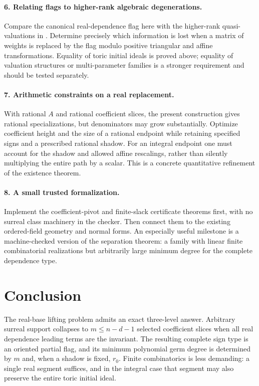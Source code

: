 \documentclass[11pt,a4paper]{article}
\numberwithin{equation}{section}
\theoremstyle{plain}
\begin{document}
\paragraph{6. Relating flags to higher-rank algebraic degenerations.}
Compare the canonical real-dependence flag here with the higher-rank
quasi-valuations in \cite{fs:CCFL}. Determine precisely which information is
lost when a matrix of weights is replaced by the flag modulo positive
triangular and affine transformations. Equality of toric initial ideals
is proved above; equality of valuation structures or multi-parameter
families is a stronger requirement and should be tested separately.

\paragraph{7. Arithmetic constraints on a real replacement.}
With rational $A$ and rational coefficient slices, the present construction
gives rational specializations, but denominators may grow substantially.
Optimize coefficient height and the size of a rational endpoint while
retaining specified signs and a prescribed rational shadow. For an
integral endpoint one must account for the shadow and allowed affine
rescalings, rather than silently multiplying the entire path by a scalar.
This is a concrete quantitative refinement of the existence theorem.

\paragraph{8. A small trusted formalization.}
Implement the coefficient-pivot and finite-slack certificate theorems first,
with no surreal class machinery in the checker. Then connect them to the
existing ordered-field geometry and normal forms. An especially useful
milestone is a machine-checked version of the separation theorem: a
family with linear finite combinatorial realizations but arbitrarily large
minimum degree for the complete dependence type.

\section{Conclusion}

The real-base lifting problem admits an exact three-level answer. Arbitrary
surreal support collapses to $m\le n-d-1$ selected coefficient slices
when all real dependence leading terms are the invariant. The resulting
complete sign type is an oriented partial flag, and its minimum polynomial
germ degree is determined by $m$ and, when a shadow is fixed, $r_0$.
Finite combinatorics is less demanding: a single real segment suffices,
and in the integral case that segment may also preserve the entire toric
initial ideal.
\end{document}
